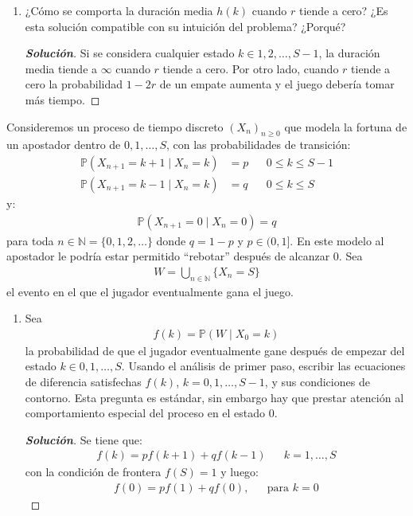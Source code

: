 \documentclass[12pt, letterpaper]{article}
\newcommand{\p}{\mathbb{P}}
\newenvironment{manualtheorem}[1]{%
  \renewcommand\themanualtheoreminner{#1}%
  \manualtheoreminner
}{\endmanualtheoreminner}
\newenvironment{solucion}
  {\renewcommand\qedsymbol{$\square$}\begin{proof}[\textbf{Solución}]}
  {\end{proof}}
\begin{document}
\begin{manualtheorem}{3.1}
\begin{enumerate}
        \item ¿Cómo se comporta la duración media $h(k)$ cuando $r$ tiende a cero? ¿Es esta solución compatible con su intuición del problema? ¿Porqué?
        \begin{solucion}
            Si se considera cualquier estado $k \in {1, 2,\dots,S - 1}$, la duración media tiende a $\infty$ cuando $r$ tiende a cero. Por otro lado, cuando $r$ tiende a cero la probabilidad $1 - 2r$ de un empate aumenta y el juego debería tomar más tiempo.
        \end{solucion}
    \end{enumerate}
    
    \end{manualtheorem}
    
    \begin{manualtheorem}{3.2}
    Consideremos un proceso de tiempo discreto $(X_n)_{n\geq0}$ que modela la fortuna de un apostador dentro de ${0, 1,\dots,S}$, con las probabilidades de transición:
    \begin{align*}
        \p(X_{n+1}=k+1 \mid X_n = k)&=p & &  0 \leq k \leq S-1\\
        \p(X_{n+1}=k-1 \mid X_n = k)&=q & &  0 \leq k \leq S
    \end{align*}
    y:
    \begin{align*}
        \p(X_{n+1}=0 \mid X_n = 0)=q
    \end{align*}
    para toda $n\in \mathbb{N}=\{0, 1, 2, \dots\}$ donde $q=1-p$ y $p\in(0,1]$. En este modelo al apostador le podría estar permitido ``rebotar'' después de alcanzar 0. 
    Sea
    \begin{align*}
        W=\bigcup_{n\in \mathbb{N}} \{X_{n}=S\}
    \end{align*}
    el evento en el que el jugador eventualmente gana el juego.
    \renewcommand{\labelenumi}{(\alph{enumi})}
    \begin{enumerate}
        \item Sea
        \begin{align*}
            f(k)=\p(W\mid X_0 = k)
        \end{align*}
        la probabilidad de que el jugador eventualmente gane después de empezar del estado $k\in{0, 1, \dots,S}$. Usando el análisis de primer paso, escribir las ecuaciones de diferencia satisfechas $f(k)$, $k=0, 1, \dots, S-1$, y sus condiciones de contorno. Esta pregunta es estándar, sin embargo hay que prestar atención al comportamiento especial del proceso en el estado 0.
        \begin{solucion}
            Se tiene que:
            \begin{align*}
                f(k)=pf(k+1)+qf(k-1) & & k=1,\dots,S
            \end{align*}
            con la condición de frontera $f(S)=1$ y luego:
            \begin{align*}
                f(0)=pf(1)+qf(0),& & \textrm{para } k=0
            \end{align*}
        \end{solucion}
        

\end{enumerate}
\end{manualtheorem}
\end{document}
